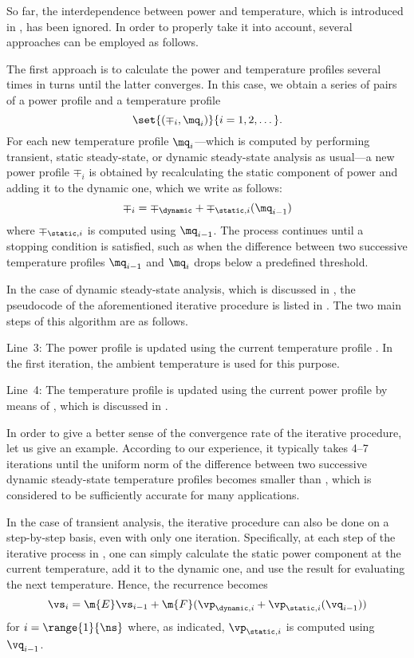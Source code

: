 So far, the interdependence between power and temperature, which is introduced
in , has been ignored. In order to properly take it into
account, several approaches can be employed as follows.

The first approach is to calculate the power and temperature profiles several
times in turns until the latter converges. In this case, we obtain a series of
pairs of a power profile and a temperature profile
\[
  \set{(\mp_i, \mq_i)}{i = 1, 2, \dots}.
\]
For each new temperature profile $\mq_i$---which is computed by performing
transient, static steady-state, or dynamic steady-state analysis as usual---a
new power profile $\mp_i$ is obtained by recalculating the static component of
power and adding it to the dynamic one, which we write as follows:
\[
  \mp_i = \mp_\dynamic + \mp_{\static, i}(\mq_{i - 1})
\]
where $\mp_{\static, i}$ is computed using $\mq_{i - 1}$. The process continues
until a stopping condition is satisfied, such as when the difference between two
successive temperature profiles $\mq_{i - 1}$ and $\mq_i$ drops below a
predefined threshold.

In the case of dynamic steady-state analysis, which is discussed in
, the pseudocode of the aforementioned iterative
procedure is listed in . The two
main steps of this algorithm are as follows.

Line~3: The power profile \mp is updated using the current temperature profile
\mq. In the first iteration, the ambient temperature is used for this purpose.

Line~4: The temperature profile \mq is updated using the current power profile
\mp by means of , which is discussed in
.

In order to give a better sense of the convergence rate of the iterative
procedure, let us give an example. According to our experience, it typically
takes 4--7 iterations until the uniform norm of the difference between two
successive dynamic steady-state temperature profiles becomes smaller than
, which is considered to be sufficiently accurate for many
applications.

In the case of transient analysis, the iterative procedure can also be done on a
step-by-step basis, even with only one iteration. Specifically, at each step of
the iterative process in , one can simply calculate
the static power component at the current temperature, add it to the dynamic
one, and use the result for evaluating the next temperature. Hence, the
recurrence becomes
\[
  \vs_i = \m{E} \vs_{i - 1} + \m{F} (\vp_{\dynamic, i} + \vp_{\static, i}(\vq_{i - 1}))
\]
for $i = \range{1}{\ns}$ where, as indicated, $\vp_{\static, i}$ is computed
using $\vq_{i - 1}$.


